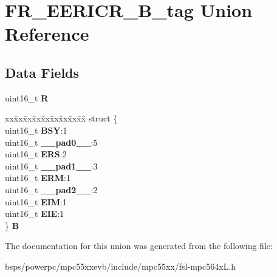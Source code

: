 \hypertarget{unionFR__EERICR__16B__tag}{}\section{F\+R\+\_\+\+E\+E\+R\+I\+C\+R\+\_\+B\+\_\+tag Union Reference}
\label{unionFR__EERICR__16B__tag}
\subsection*{Data Fields}
\begin{DoxyCompactItemize}
\item 
\mbox{\label{unionFR__EERICR__16B__tag_a72660442de840f1a2833afac421238ff}} 
uint16\+\_\+t {\bfseries R}
\item 
\mbox{\label{unionFR__EERICR__16B__tag_ac290e1310435011e922ba95427e87be9}} 
\begin{tabbing}
xx\=xx\=xx\=xx\=xx\=xx\=xx\=xx\=xx\=\kill
struct \{\\
\>uint16\_t {\bfseries BSY}:1\\
\>uint16\_t {\bfseries \_\_pad0\_\_}:5\\
\>uint16\_t {\bfseries ERS}:2\\
\>uint16\_t {\bfseries \_\_pad1\_\_}:3\\
\>uint16\_t {\bfseries ERM}:1\\
\>uint16\_t {\bfseries \_\_pad2\_\_}:2\\
\>uint16\_t {\bfseries EIM}:1\\
\>uint16\_t {\bfseries EIE}:1\\
\} {\bfseries B}\\

\end{tabbing}\end{DoxyCompactItemize}


The documentation for this union was generated from the following file\+:\begin{DoxyCompactItemize}
\item 
bsps/powerpc/mpc55xxevb/include/mpc55xx/fsl-\/mpc564x\+L.\+h\end{DoxyCompactItemize}
